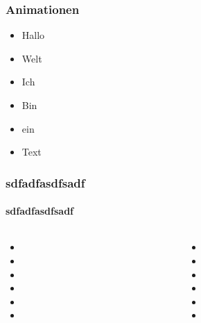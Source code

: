\documentclass[12pt,ngerman]{beamer}
\begin{document}
\begin{frame}
\frametitle{Animationen}

\begin{itemize}
\item<2> Hallo
\item<-3> Welt
\item<1,3> Ich
\item<1-> Bin
\item ein
\item Text
\end{itemize}
\end{frame}

\begin{frame}
\frametitle{sdfadfasdfsadf}
\framesubtitle{sdfadfasdfsadf}


\begin{columns}
\begin{column}{0.49\textwidth}
\begin{itemize}
	\item 
	\item 
	\item 
	\item 
	\item 
	\item 
	\end{itemize}
\end{column}
\begin{column}{0.49\textwidth}
\begin{itemize}
	\item 
	\item 
	\item 
	\item 
	\item 
	\item 
	\end{itemize}
\end{column}
\end{columns}

\end{frame}
\end{document}
